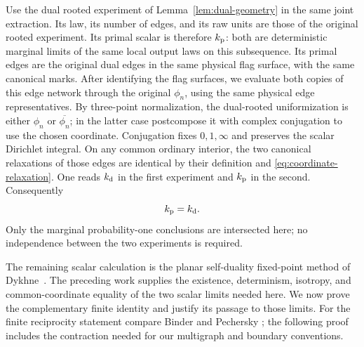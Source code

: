 Use the dual rooted experiment of Lemma~\ref{lem:dual-geometry} in the
same joint extraction.  Its law, its number of edges, and its raw units
are those of the original rooted experiment.  Its primal scalar is
therefore \(k_{\rm p}\): both are deterministic marginal limits of the
same local output laws on this subsequence.  Its primal edges are the
original dual edges in the same physical flag surface, with the same
canonical marks.  After identifying the flag surfaces, we evaluate both
copies of this edge network through the original \(\phi_n\), using the
same physical edge representatives.  By three-point normalization, the
dual-rooted uniformization is either \(\phi_n\) or
\(\overline{\phi_n}\); in the latter case postcompose it with complex
conjugation to use the chosen coordinate.  Conjugation fixes
\(0,1,\infty\) and preserves the scalar Dirichlet integral.
On any common ordinary interior, the two canonical
relaxations of those edges are identical by their definition and
\eqref{eq:coordinate-relaxation}.  One reads \(k_{\rm d}\) in the first
experiment and \(k_{\rm p}\) in the second.  Consequently
\begin{equation}\label{eq:equal-dual-scalars}
                         k_{\rm p}=k_{\rm d}.
\end{equation}
Only the marginal probability-one conclusions are intersected here;
no independence between the two experiments is required.

The remaining scalar calculation is the planar self-duality fixed-point
method of Dykhne~\cite[Section~2]{Dykhne1971}.  The preceding work supplies
the existence, determinism, isotropy, and common-coordinate equality of
the two scalar limits needed here.  We now prove the complementary finite
identity and justify its passage to those limits.  For the finite
reciprocity statement compare Binder and Pechersky
\cite[Remark~2.11]{BinderPechersky2025}; the following proof includes the
contraction needed for our multigraph and boundary conventions.

